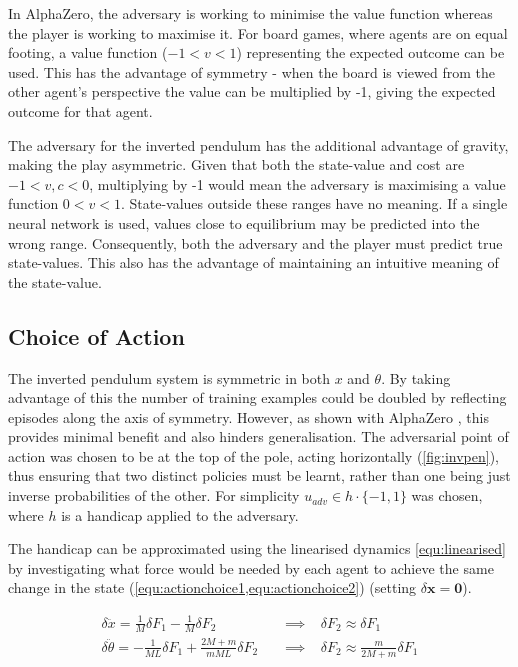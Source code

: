 \documentclass[../main.tex]{subfiles}
\begin{document}
In AlphaZero, the adversary is working to minimise the value function whereas the player is working to maximise it. For board games, where agents are on equal footing, a value function ($-1 < v < 1$) representing the expected outcome can be used. This has the advantage of symmetry - when the board is viewed from the other agent's perspective the value can be multiplied by -1, giving the expected outcome for that agent.

The adversary for the inverted pendulum has the additional advantage of gravity, making the play asymmetric. Given that both the state-value and cost are $-1 < v, c < 0$, multiplying by -1 would mean the adversary is maximising a value function $0 < v < 1$. State-values outside these ranges have no meaning. If a single neural network is used, values close to equilibrium may be predicted into the wrong range. Consequently, both the adversary and the player must predict true state-values. This also has the advantage of maintaining an intuitive meaning of the state-value.

\subsection{Choice of Action}
\label{sec:choiceofaction}

The inverted pendulum system is symmetric in both $x$ and $\theta$. By taking advantage of this the number of training examples could be doubled by reflecting episodes along the axis of symmetry. However, as shown with AlphaZero \cite{AlphaZero}, this provides minimal benefit and also hinders generalisation. The adversarial point of action was chosen to be at the top of the pole, acting horizontally (\cref{fig:invpen}), thus ensuring that two distinct policies must be learnt, rather than one being just inverse probabilities of the other. For simplicity $u_{adv} \in h \cdot \{-1, 1\}$ was chosen, where $h$ is a handicap applied to the adversary.

The handicap can be approximated using the linearised dynamics \cref{equ:linearised} by investigating what force would be needed by each agent to achieve the same change in the state (\cref{equ:actionchoice1,equ:actionchoice2}) (setting $\delta \boldsymbol{x} = \boldsymbol{0}$).

\begin{subequations}
\begin{align}
   \delta \ddot{x} = \frac{1}{M}\delta F_1 - \frac{1}{M} \delta F_2 \hspace{10pt} &\implies \hspace{10pt} \delta F_2 \approx \delta F_1 \label{equ:actionchoice1} \\
   \delta \ddot{\theta} = -\frac{1}{ML} \delta F_1 + \frac{2M + m}{mML} \delta F_2 \hspace{10pt} &\implies \hspace{10pt} \delta F_2 \approx \frac{m}{2M + m} \delta F_1 \label{equ:actionchoice2}
\end{align}
\end{subequations}
\end{document}
